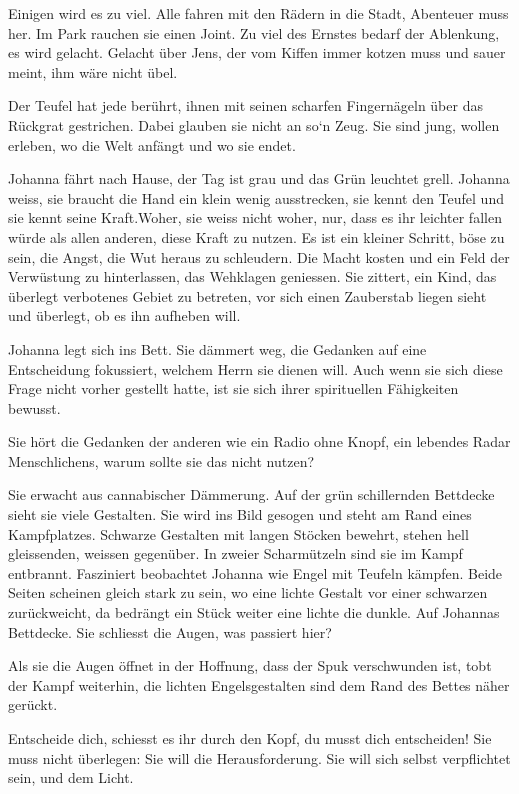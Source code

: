 \documentclass[10pt,a5paper]{book}
\begin{document}
Einigen wird es zu viel. Alle fahren mit den Rädern in die Stadt, Abenteuer muss her. Im Park rauchen sie einen Joint. Zu viel des Ernstes bedarf der Ablenkung, es wird gelacht. Gelacht über Jens, der vom Kiffen immer kotzen muss und sauer meint, ihm wäre nicht übel.

Der Teufel hat jede berührt, ihnen mit seinen scharfen Fingernägeln über das Rückgrat gestrichen. Dabei glauben sie nicht an so`n Zeug. Sie sind jung, wollen erleben, wo die Welt anfängt und wo sie endet.

Johanna fährt nach Hause, der Tag ist grau und das Grün leuchtet grell. Johanna weiss, sie braucht die Hand ein klein wenig ausstrecken, sie kennt den Teufel und sie kennt seine Kraft.Woher, sie weiss nicht woher, nur, dass es ihr leichter fallen würde als allen anderen, diese Kraft zu nutzen. Es ist ein kleiner Schritt, böse zu sein, die Angst, die Wut heraus zu schleudern. Die Macht kosten und ein Feld der Verwüstung zu hinterlassen, das Wehklagen geniessen. Sie zittert, ein Kind, das überlegt verbotenes Gebiet zu betreten, vor sich einen Zauberstab liegen sieht und überlegt, ob es ihn aufheben will.

Johanna legt sich ins Bett. Sie dämmert weg, die Gedanken auf eine Entscheidung fokussiert, welchem Herrn sie dienen will. Auch wenn sie sich diese Frage nicht vorher gestellt hatte, ist sie sich ihrer spirituellen Fähigkeiten bewusst.

Sie hört die Gedanken der anderen wie ein Radio ohne Knopf, ein lebendes Radar Menschlichens, warum sollte sie das nicht nutzen?

Sie erwacht aus cannabischer Dämmerung. Auf der grün schillernden Bettdecke sieht sie viele Gestalten. Sie wird ins Bild gesogen und steht am Rand eines Kampfplatzes. Schwarze Gestalten mit langen Stöcken bewehrt, stehen hell gleissenden, weissen gegenüber. In zweier Scharmützeln sind sie im Kampf entbrannt. Fasziniert beobachtet Johanna wie Engel mit Teufeln kämpfen. Beide Seiten scheinen gleich stark zu sein, wo eine lichte Gestalt vor einer schwarzen zurückweicht, da bedrängt ein Stück weiter eine lichte die dunkle. Auf Johannas Bettdecke. Sie schliesst die Augen, was passiert hier? 

Als sie die Augen öffnet in der Hoffnung, dass der Spuk verschwunden ist, tobt der Kampf weiterhin, die lichten Engelsgestalten sind dem Rand des Bettes näher gerückt.

Entscheide dich, schiesst es ihr durch den Kopf, du musst dich entscheiden! Sie muss nicht überlegen: Sie will die Herausforderung. 
Sie will sich selbst verpflichtet sein, und dem Licht.
\end{document}
